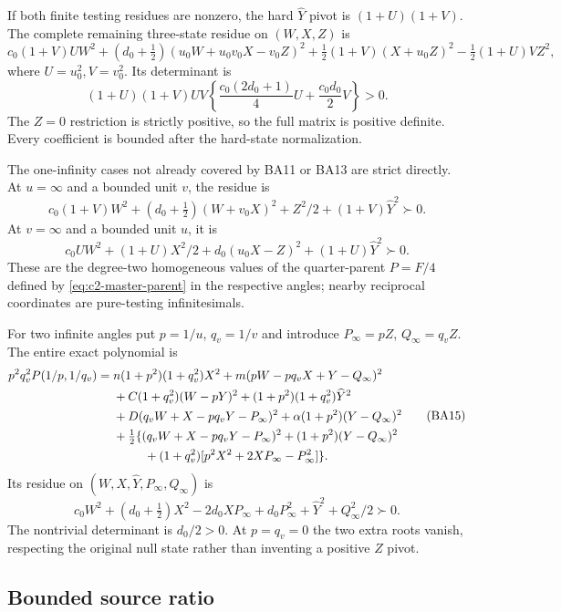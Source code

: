 If both finite testing residues are nonzero, the hard
$\widehat Y$ pivot is $(1+U)(1+V)$. The complete remaining
three-state residue on $(W,X,Z)$ is
\[
 c_0(1+V)UW^2+(d_0+\tfrac12)(u_0W+u_0v_0X-v_0Z)^2
 +\tfrac12(1+V)(X+u_0Z)^2-\tfrac12(1+U)VZ^2,
\]
where $U=u_0^2,V=v_0^2$. Its determinant is
\[
 (1+U)(1+V)UV\left\{\frac{c_0(2d_0+1)}4U
                              +\frac{c_0d_0}2V\right\}>0.        \tag{BA14}
\]
The $Z=0$ restriction is strictly positive, so the full matrix is
positive definite. Every coefficient is bounded after the hard-state
normalization.

The one-infinity cases not already covered by BA11 or BA13 are
strict directly. At $u=\infty$ and a bounded unit $v$, the residue is
\[
 c_0(1+V)W^2+(d_0+\tfrac12)(W+v_0X)^2+Z^2/2
 +(1+V)\widehat Y^2\succ0.
\]
At $v=\infty$ and a bounded unit $u$, it is
\[
 c_0UW^2+(1+U)X^2/2+d_0(u_0X-Z)^2
 +(1+U)\widehat Y^2\succ0.
\]
These are the degree-two homogeneous values of the quarter-parent $P=F/4$ defined by \eqref{eq:c2-master-parent} in the respective
angles; nearby reciprocal coordinates are pure-testing infinitesimals.

For two infinite angles put $p=1/u$, $q_v=1/v$ and introduce
$P_\infty=pZ$, $Q_\infty=q_vZ$. The entire exact polynomial is
\[
 \begin{split}
 p^2q_v^2P(1/p,1/q_v)={}&n(1+p^2)(1+q_v^2)X^2
 +m(pW-pq_vX+Y-Q_\infty)^2\\
 &+C(1+q_v^2)(W-pY)^2
 +(1+p^2)(1+q_v^2)\widehat Y^2\\
 &+D(q_vW+X-pq_vY-P_\infty)^2
 +\alpha(1+p^2)(Y-Q_\infty)^2\\
 &+\tfrac12\{(q_vW+X-pq_vY-P_\infty)^2
 +(1+p^2)(Y-Q_\infty)^2\\
 &\hspace{9mm}+(1+q_v^2)[p^2X^2+2XP_\infty-P_\infty^2]\}.
 \end{split}                                                       \tag{BA15}
\]
Its residue on $(W,X,\widehat Y,P_\infty,Q_\infty)$ is
\[
 c_0W^2+(d_0+\tfrac12)X^2-2d_0XP_\infty
 +d_0P_\infty^2+\widehat Y^2+Q_\infty^2/2\succ0.
\]
The nontrivial determinant is $d_0/2>0$. At $p=q_v=0$ the two
extra roots vanish, respecting the original null state rather than
inventing a positive $Z$ pivot.

\subsection{Bounded source ratio}
\label{sec:c2-bounded-a-new}

